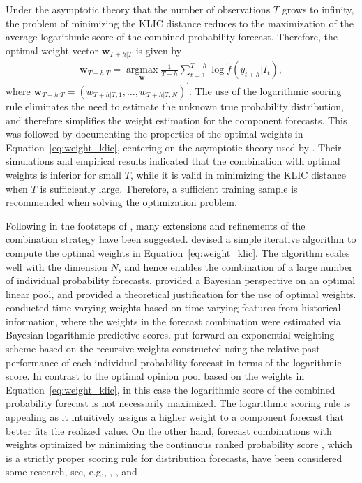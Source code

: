 \documentclass[a4paper,11pt]{article}
\begin{document}
Under the asymptotic theory that the number of observations $T$ grows to infinity, the problem of minimizing the KLIC distance reduces to the maximization of the average logarithmic score of the combined probability forecast. Therefore, the optimal weight vector $\bm{w}_{T+h|T}$ is given by
\begin{align}
  \label{eq:weight_klic}
  \bm{w}_{T+h|T} = \underset{\bm{w}}{\operatorname{argmax}} \frac{1}{T-h} \sum_{t=1}^{T-h} \log \tilde{f}(y_{t+h}|I_{t}),
\end{align}
where $\bm{w}_{T+h|T}=\left(w_{T+h|T, 1}, \dots, w_{T+h|T, N}\right)^{\prime}$. The use of the logarithmic scoring rule eliminates the need to estimate the unknown true probability distribution, and therefore simplifies the weight estimation for the component forecasts. This was followed by \citet{Pauwels2016-ci} documenting the properties of the optimal weights in Equation~\eqref{eq:weight_klic}, centering on the asymptotic theory used by \citet{Hall2007-lh}. Their simulations and empirical results indicated that the combination with optimal weights is inferior for small $T$, while it is valid in minimizing the KLIC distance when $T$ is sufficiently large. Therefore, a sufficient training sample is recommended when solving the optimization problem.

Following in the footsteps of \citet{Hall2007-lh}, many extensions and refinements of the combination strategy have been suggested. \citet{Conflitti2015-fq} devised a simple iterative algorithm to compute the optimal weights in Equation~\eqref{eq:weight_klic}. The algorithm scales well with the dimension $N$, and hence enables the combination of a large number of individual probability forecasts. \citet{Geweke2011-xk} provided a Bayesian perspective on an optimal linear pool, and provided a theoretical justification for the use of optimal weights. \citet{Li2021-gk} conducted time-varying weights based on time-varying features from historical information, where the weights in the forecast combination were estimated via Bayesian logarithmic predictive scores. \citet{Jore2010-yi} put forward an exponential weighting scheme based on the recursive weights constructed using the relative past performance of each individual probability forecast in terms of the logarithmic score. In contrast to the optimal opinion pool based on the weights in Equation~\eqref{eq:weight_klic}, in this case the logarithmic score of the combined probability forecast is not necessarily maximized. The logarithmic scoring rule is appealing as it intuitively assigns a higher weight to a component forecast that better fits the realized value. On the other hand, forecast combinations with weights optimized by minimizing the continuous ranked probability score \citep[CRPS,][]{Gneiting2007-ij}, which is a strictly proper scoring rule for distribution forecasts, have been considered some research, see, e.g,, \citet{Raftery2005-vu}, \citet{Thorey2017-on}, and \citet{Thorey2018-en}.
\end{document}
